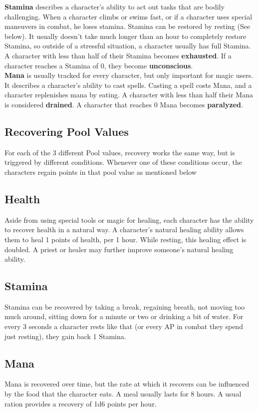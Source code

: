 \textbf{Stamina} describes a character's ability to act out tasks that are bodily challenging. When a character climbs or swims fast, or if a character uses special maneuvers in combat, he loses stamina. Stamina can be restored by resting (See below). It usually doesn't take much longer than an hour to completely restore Stamina, so outside of a stressful situation, a character usually has full Stamina. A character with less than half of their Stamina becomes \textbf{exhausted}. If a character reaches a Stamina of 0, they become \textbf{unconscious}.\\


\textbf{Mana} is usually tracked for every character, but only important for magic users. It describes a character's ability to cast spells. Casting a spell costs Mana, and a character replenishes mana by eating. A character with less than half their Mana is considered \textbf{drained}. A character that reaches 0 Mana becomes \textbf{paralyzed}.\\


\subsection{Recovering Pool Values}

For each of the 3 different Pool values, recovery works the same way, but is triggered by different conditions. Whenever one of these conditions occur, the characters regain points in that pool value as mentioned below


\subsection{Health}

Aside from using special tools or magic for healing, each character has the ability to recover health in a natural way. A character's natural healing ability allows them to heal 1 points of health, per 1 hour. While resting, this healing effect is doubled.
A priest or healer may further improve someone's natural healing ability.


\subsection{Stamina}

Stamina can be recovered by taking a break, regaining breath, not moving too much around, sitting down for a minute or two or drinking a bit of water. For every 3 seconds a character rests like that (or every AP in combat they spend just resting), they gain back 1 Stamina.


\subsection{Mana}

Mana is recovered over time, but the rate at which it recovers can be influenced by the food that the character eats. A meal usually lasts for 8 hours. A usual ration provides a recovery of 1d6 points per hour.